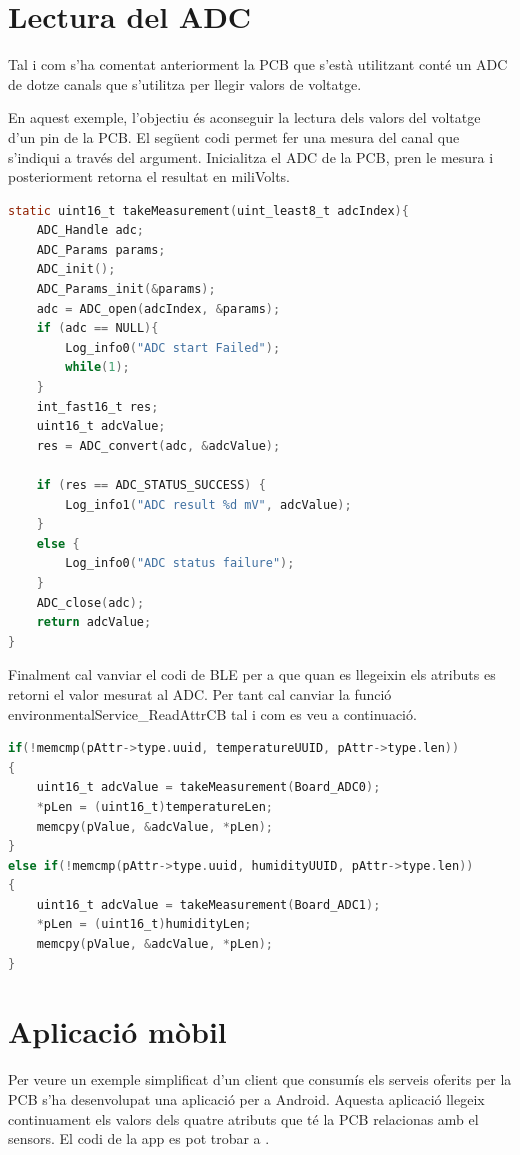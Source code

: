 \section{Lectura del ADC}
Tal i com s'ha comentat anteriorment la PCB que s'està utilitzant conté un ADC de dotze canals que s'utilitza per llegir valors de voltatge.

En aquest exemple, l'objectiu és aconseguir la lectura dels valors del voltatge d'un pin de la PCB.
El següent codi permet fer una mesura del canal que s'indiqui a través del argument.
Inicialitza el ADC de la PCB, pren le mesura i posteriorment retorna el resultat en miliVolts.

\begin{lstlisting}[language=C]
static uint16_t takeMeasurement(uint_least8_t adcIndex){
	ADC_Handle adc;
	ADC_Params params;
	ADC_init();
	ADC_Params_init(&params);
	adc = ADC_open(adcIndex, &params);
	if (adc == NULL){
		Log_info0("ADC start Failed");
		while(1);
	}
	int_fast16_t res;
	uint16_t adcValue;
	res = ADC_convert(adc, &adcValue);
	
	if (res == ADC_STATUS_SUCCESS) {
		Log_info1("ADC result %d mV", adcValue);
	}
	else {
		Log_info0("ADC status failure");
	}
	ADC_close(adc);
	return adcValue;
}
\end{lstlisting}

Finalment cal vanviar el codi de BLE per a que quan es llegeixin els atributs es retorni el valor mesurat al ADC.
Per tant cal canviar la funció environmentalService\_ReadAttrCB tal i com es veu a continuació.

\begin{lstlisting}[language=C]
  if(!memcmp(pAttr->type.uuid, temperatureUUID, pAttr->type.len))
{
	uint16_t adcValue = takeMeasurement(Board_ADC0);
	*pLen = (uint16_t)temperatureLen;
	memcpy(pValue, &adcValue, *pLen);
}
else if(!memcmp(pAttr->type.uuid, humidityUUID, pAttr->type.len))
{
	uint16_t adcValue = takeMeasurement(Board_ADC1);
	*pLen = (uint16_t)humidityLen;
	memcpy(pValue, &adcValue, *pLen);
}
\end{lstlisting}

\section{Aplicació mòbil}
Per veure un exemple simplificat d'un client que consumís els serveis oferits per la PCB s'ha desenvolupat una aplicació per a Android.
Aquesta aplicació llegeix continuament els valors dels quatre atributs que té la PCB relacionas amb el sensors.
El codi de la app es pot trobar a \cite{android_repo}.

